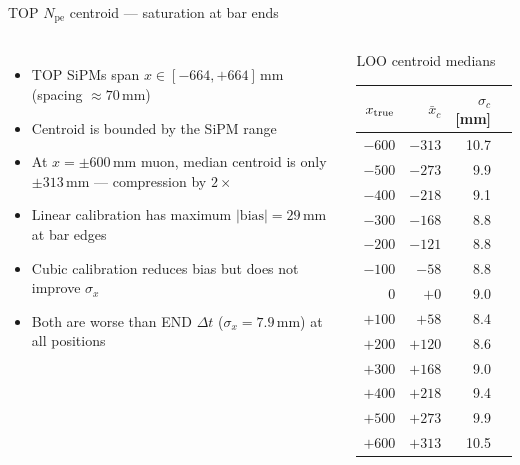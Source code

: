 \documentclass[aspectratio=169,9pt]{beamer}
\newcommand{\mm}{\ensuremath{\,\mathrm{mm}}}
\begin{document}
\begin{frame}{TOP $N_{\mathrm{pe}}$ centroid — saturation at bar ends}
\begin{columns}[c]
\begin{itemize}\setlength\itemsep{4pt}
  \item TOP SiPMs span $x \in [-664, +664]\mm$
    (spacing $\approx70\mm$)
  \item Centroid is bounded by the SiPM range
  \item At $x=\pm600\mm$ muon, median centroid
    is only $\pm313\mm$ — compression by $2\times$
  \item Linear calibration has maximum
    $|\mathrm{bias}|=29\mm$ at bar edges
  \item Cubic calibration reduces bias but
    does not improve $\sigma_x$
  \item Both are worse than END $\Delta t$
    ($\sigma_x=7.9\mm$) at all positions
\end{itemize}
\begin{block}{LOO centroid medians}
\scriptsize
\begin{tabular}{rrrr}
\toprule
$x_{\rm true}$ & $\bar x_c$ & $\sigma_c$ [mm] \\
\midrule
$-600$ & $-313$ & 10.7 \\
$-500$ & $-273$ & 9.9 \\
$-400$ & $-218$ & 9.1 \\
$-300$ & $-168$ & 8.8 \\
$-200$ & $-121$ & 8.8 \\
$-100$ & $-58$ & 8.8 \\
$\phantom{+}0$ & $+0$ & 9.0 \\
$+100$ & $+58$ & 8.4 \\
$+200$ & $+120$ & 8.6 \\
$+300$ & $+168$ & 9.0 \\
$+400$ & $+218$ & 9.4 \\
$+500$ & $+273$ & 9.9 \\
$+600$ & $+313$ & 10.5 \\
\bottomrule
\end{tabular}
\end{block}
\end{columns}
\end{frame}
\end{document}
